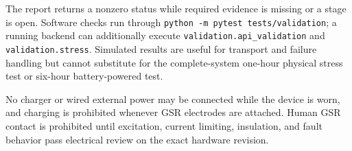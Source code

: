 The report returns a nonzero status while required evidence is missing or a stage is open. Software checks run through \texttt{python -m pytest tests/validation}; a running backend can additionally execute \texttt{validation.api\_validation} and \texttt{validation.stress}. Simulated results are useful for transport and failure handling but cannot substitute for the complete-system one-hour physical stress test or six-hour battery-powered test.

\begin{warningbox}
No charger or wired external power may be connected while the device is worn, and charging is prohibited whenever GSR electrodes are attached. Human GSR contact is prohibited until excitation, current limiting, insulation, and fault behavior pass electrical review on the exact hardware revision.
\end{warningbox}
